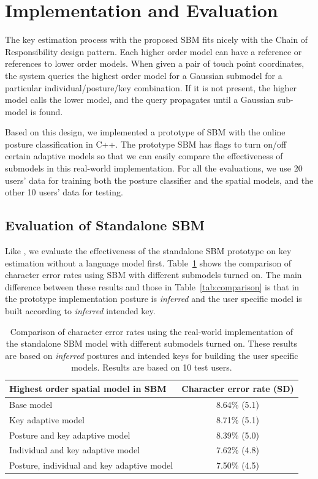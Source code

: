 \documentclass{sigchi}
\newcommand\tabhead[1]{\small\textbf{#1}}
\begin{document}
\section{Implementation and Evaluation}
The key estimation process with the proposed SBM fits nicely with the
Chain of Responsibility design pattern. Each higher order model can
have a reference or references to lower order models. When given a pair of touch
point coordinates, the system queries the highest order model for a Gaussian
submodel for a particular individual/posture/key combination. If it is not present, 
the higher model calls the lower model, and the
query propagates until a Gaussian sub-model is found. 

Based on this design, we implemented a prototype of SBM with the online posture 
classification in C++. The prototype SBM has flags to turn on/off certain adaptive
 models so that we can easily compare the effectiveness of submodels in this real-world implementation. 
 For all the evaluations, we use 20 users' data for training both the posture classifier 
 and the spatial models, and the other 10 users' data for testing. 

\subsection{Evaluation of Standalone SBM}
Like \cite{Findlater:2012, Rudchenko:2011}, we evaluate the effectiveness of the standalone SBM  prototype on key estimation without a language model first. 
Table~\ref{tab:off-device} shows the comparison of
character error rates using SBM with different submodels turned on. The main difference between these results and those in Table~\ref{tab:comparison} is that in the prototype implementation posture is \textit{inferred} and the user specific model is built according to \textit{inferred} intended key.

\begin{table}[tb]
  \centering
  \begin{tabular}{|l|c|}
  \hline
  \tabhead{Highest order spatial model in SBM} &  
  \multicolumn{1}{|p{0.2\columnwidth}|}{\centering\tabhead{Character error rate
  (SD)}}
  \\
  \hline
 Base model & 8.64\% (5.1)\\
  \hline
  Key adaptive model & 8.71\% (5.1) \\
  \hline
    \multicolumn{1}{|p{0.7\columnwidth}|}{Posture and key adaptive model} &
    8.39\% (5.0)\\
  \hline
  Individual and key adaptive model  & 7.62\% (4.8)
  \\
  \hline
  Posture, individual and key adaptive model &  7.50\% (4.5)
  \\
  \hline
  \end{tabular}
  \caption{Comparison of character error rates using the real-world implementation of the standalone SBM model with different submodels turned on.  These results are based on \textit{inferred} postures and intended keys for building the user specific models. Results are based on 10 test users.}
  \label{tab:off-device}
\end{table}
\end{document}
